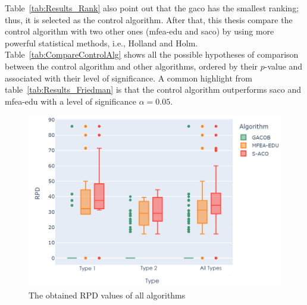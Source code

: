 \bigskip
\begin{table}[!htp]
	\centering
	\caption{The z-values and p-values of the Friedman procedures ( is the control algorithm)} 
	\label{tab:CompareControlAlg}
\end{table}

Table~\ref{tab:Results_Rank} also point out that the \acrshort{gaco} has the smallest ranking; thus, it is selected as the control algorithm. After that, this thesis compare the control algorithm with two other ones (\acrshort{mfea-edu} and \acrshort{saco}) by using more powerful statistical methods, i.e., Holland and Holm. Table~\ref{tab:CompareControlAlg} shows all the possible hypotheses of comparison between the control algorithm and other algorithms, ordered by their $p$-value and associated with their level of significance. A common highlight from table~\ref{tab:Results_Friedman} is that the control algorithm outperforms \acrshort{saco} and \acrshort{mfea-edu} with a level of significance $\alpha = 0.05$.
\bigskip
\renewcommand{\scalefigure}{0.5}
\begin{figure}[htbp]
	\centering
	\includegraphics[scale=\scalefigure]{Figures/chap 4/RPD_each_set.png}
	\caption{The obtained RPD values of all algorithms}
	\label{fig:rpd}
\end{figure}
\bigskip
